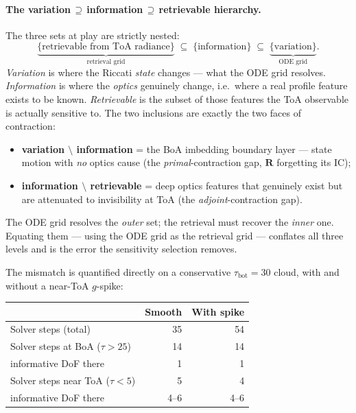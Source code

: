 \documentclass[11pt,a4paper]{article}
\newcommand{\mat}[1]{\mathbf{#1}}
\newcommand{\tbot}{\tau_{\mathrm{bot}}}
\theoremstyle{definition}
\begin{document}
\paragraph{The variation\,$\supseteq$\,information\,$\supseteq$\,retrievable
hierarchy.}  The three sets at play are strictly nested:
\begin{equation}\label{eq:hierarchy}
  \underbrace{\bigl\{\text{retrievable from ToA radiance}\bigr\}}_{\text{retrieval grid}}
  \;\subseteq\;
  \bigl\{\text{information}\bigr\}
  \;\subseteq\;
  \underbrace{\bigl\{\text{variation}\bigr\}}_{\text{ODE grid}} .
\end{equation}
\emph{Variation} is where the Riccati \emph{state} changes --- what the
ODE grid resolves.  \emph{Information} is where the \emph{optics}
genuinely change, i.e.\ where a real profile feature exists to be known.
\emph{Retrievable} is the subset of those features the ToA observable is
actually sensitive to.  The two inclusions are exactly the two faces of
contraction:
\begin{itemize}[nosep]
  \item \textbf{variation $\setminus$ information} = the BoA imbedding
    boundary layer --- state motion with \emph{no} optics cause (the
    \emph{primal}-contraction gap, $\mat{R}$ forgetting its IC);
  \item \textbf{information $\setminus$ retrievable} = deep optics
    features that genuinely exist but are attenuated to invisibility at
    ToA (the \emph{adjoint}-contraction gap).
\end{itemize}
The ODE grid resolves the \emph{outer} set; the retrieval must recover
the \emph{inner} one.  Equating them --- using the ODE grid as the
retrieval grid --- conflates all three levels and is the error the
sensitivity selection removes.

The mismatch is quantified directly on a conservative $\tbot=30$ cloud,
with and without a near-ToA $g$-spike:

\begin{center}
\begin{tabular}{l r r}
\toprule
 & Smooth & With spike\\
\midrule
Solver steps (total)             & 35   & 54\\
Solver steps at BoA ($\tau>25$)  & 14   & 14\\
\quad informative DoF there      & 1    & 1\\[3pt]
Solver steps near ToA ($\tau<5$) & 5    & 4\\
\quad informative DoF there      & 4--6 & 4--6\\
\bottomrule
\end{tabular}
\end{center}
\end{document}
